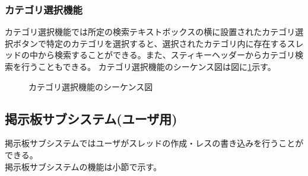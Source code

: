 \documentclass[a4j]{jarticle}
\begin{document}
    \subsubsection{カテゴリ選択機能}
    カテゴリ選択機能では所定の検索テキストボックスの横に設置されたカテゴリ選択ボタンで特定のカテゴリを選択すると、選択されたカテゴリ内に存在するスレッドの中から検索することができる。また、スティキーヘッダーからカテゴリ検索を行うこともできる。
カテゴリ選択機能のシーケンス図は図に\ref{fig:search_category.png}示す。
        \begin{figure}[H]
\centering
{}
\caption{カテゴリ選択機能のシーケンス図}
\label{fig:search_category.png}
\end{figure}
\subsection{掲示板サブシステム(ユーザ用)}
掲示板サブシステムではユーザがスレッドの作成・レスの書き込みを行うことができる。\\
掲示板サブシステムの機能は小節で示す。
\end{document}
